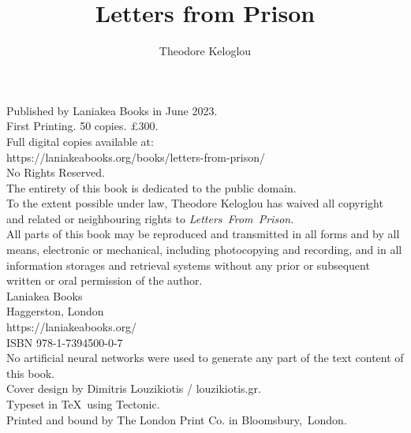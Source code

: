 \documentclass{book}
\title{Letters from Prison}
\author{Theodore Keloglou}
\date{}
\begin{document}
\frontmatter %
\pagestyle{empty} %

\maketitle

\vspace*{\fill}
\begin{center}
{
    \small
    Published by Laniakea Books in June 2023.\\
    \vspace{1em}
    First Printing. 50 copies. £300.\\
    \vspace{1em}
    Full digital copies available at:\\
    https://laniakeabooks.org/books/letters-from-prison/\\
    \vspace{1em}
    No Rights Reserved.\\
    \vspace{1em}
    The entirety of this book is dedicated to the public domain.\\
    \vspace{1em}
    To the extent possible under law, Theodore Keloglou has waived all copyright and related or neighbouring rights to \textit{Letters~From~Prison}.\\
    \vspace{1em}
    All parts of this book may be reproduced and transmitted in all forms and by all means, electronic or mechanical, including photocopying and recording, and in all information storages and retrieval systems without any prior or subsequent written or oral permission of the author.\\
    \vspace{1em}
    Laniakea Books\\
    Haggerston, London\\
    https://laniakeabooks.org/\\
    \vspace{1em}
    ISBN 978-1-7394500-0-7\\
    \vspace{1em}
    No artificial neural networks were used to generate any part of the text content of this book.\\
    \vspace{1em}
    Cover design by Dimitris Louzikiotis / louzikiotis.gr.\\
    Typeset in \TeX\ using Tectonic.\\
    Printed and bound by The London Print Co. in Bloomsbury,~London.
}
\end{center}
\end{document}
